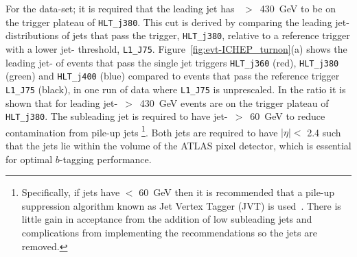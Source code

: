 For the \summer{} data-set; it is required that the leading jet has \pT{}~$>$~430~GeV to be on the trigger plateau of \verb|HLT_j380|.
This cut is derived by comparing the leading jet-\pT{} distributions of jets that pass the trigger, \verb|HLT_j380|,
relative to a reference trigger with a lower jet-\pT{} threshold, \verb|L1_J75|.
Figure~\ref{fig:evt-ICHEP_turnon}(a) shows the leading jet-\pT{}
of events that pass the single jet triggers \verb|HLT_j360| (red), \verb|HLT_j380| (green) and \verb|HLT_j400| (blue)
compared to events that pass the reference trigger \verb|L1_J75| (black),
in one run of data where \verb|L1_J75| is unprescaled.
In the ratio it is shown that for leading jet-\pT{}~$>$~430~GeV events are on the trigger plateau of \verb|HLT_j380|.
The subleading jet is required to have jet-\pT{}~$>$~60~GeV
to reduce contamination from pile-up jets
\footnote{Specifically, if jets have \pT{} $<$ 60~GeV then it is recommended that
  a pile-up suppression algorithm known as Jet Vertex Tagger (JVT) is used~\cite{evt-jvt}.
  There is little gain in acceptance from the addition of low \pT{} subleading jets and
  complications from implementing the recommendations so the jets are removed. }.
Both jets  are required to have $|\eta| <$ 2.4
such that the jets lie within the volume of the ATLAS pixel detector,
which is essential for optimal $b$-tagging performance.

